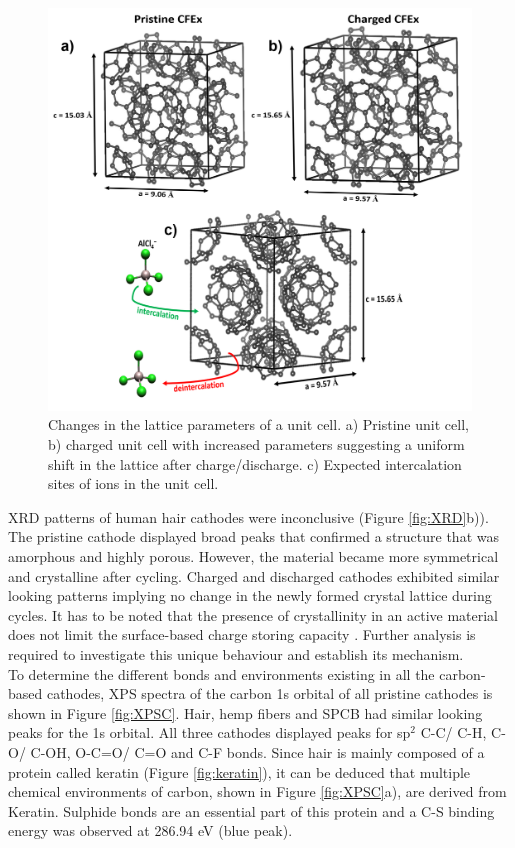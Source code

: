 \documentclass{article}
\begin{document}
\begin{figure}%
  \centering
  \includegraphics[width=\textwidth]{fig/cfexcrys}
    \caption{Changes in the lattice parameters of a  unit cell. a) Pristine unit cell, b) charged unit cell with increased parameters suggesting a uniform shift in the lattice after charge/discharge. c) Expected intercalation sites of  ions in the unit cell.}
  \label{fig:cfexcrys}
\end{figure}

XRD patterns of human hair cathodes were inconclusive (Figure \ref{fig:XRD}b)). The pristine cathode displayed broad peaks that confirmed a structure that was amorphous and highly porous. However, the material became more symmetrical and crystalline after cycling. Charged and discharged cathodes exhibited similar looking patterns implying no change in the newly formed crystal lattice during cycles. It has to be noted that the presence of crystallinity in an active material does not limit the surface-based charge storing capacity \cite{kim_synthesis_2006, jow_factors_2018}. Further analysis is required to investigate this unique behaviour and establish its mechanism.\\
To determine the different bonds and environments existing in all the carbon-based cathodes, XPS spectra of the carbon 1s orbital of all pristine cathodes is shown in Figure \ref{fig:XPSC}. Hair, hemp fibers and SPCB had similar looking peaks for the 1s orbital. All three cathodes displayed peaks for sp$^2$ C-C/ C-H, C-O/ C-OH, O-C=O/ C=O and C-F bonds. Since hair is mainly composed of a protein called keratin (Figure \ref{fig:keratin}), it can be deduced that multiple chemical environments of carbon, shown in Figure \ref{fig:XPSC}a), are derived from Keratin. Sulphide bonds are an essential part of this protein and a C-S binding energy was observed at 286.94 eV (blue peak).
\end{document}
